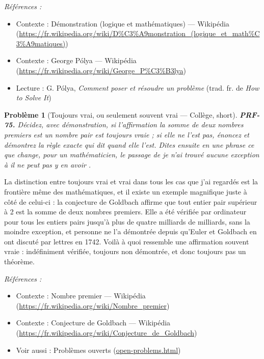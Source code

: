 \documentclass[11pt]{article}
\newtheorem{problem}{Problème}
\newenvironment{refs}{\par\small\noindent\emph{Références :}\begin{itemize}\setlength\itemsep{0pt}}{\end{itemize}\normalsize}
\begin{document}
\begin{refs}
\item Contexte : Démonstration (logique et mathématiques) --- Wikipédia (\url{https://fr.wikipedia.org/wiki/D%C3%A9monstration_(logique_et_math%C3%A9matiques)})
\item Contexte : George Pólya --- Wikipédia (\url{https://fr.wikipedia.org/wiki/George_P%C3%B3lya})
\item Lecture : G. Pólya, \textit{Comment poser et résoudre un problème} (trad. fr. de \textit{How to Solve It})
\end{refs}

\bigskip

\begin{problem}[{Toujours vrai, ou seulement souvent vrai --- Collège, short}]
\textbf{PRF-75.} Décidez, avec démonstration, si l'affirmation \og{} la
somme de deux nombres premiers est un nombre pair \fg{} est toujours vraie ; si elle ne l'est
pas, énoncez et démontrez la règle exacte qui dit quand elle l'est. Dites ensuite en une
phrase ce que change, pour un mathématicien, le passage de \og{} je n'ai trouvé aucune
exception \fg{} à \og{} il ne peut pas y en avoir \fg{}.
\end{problem}

\noindent La distinction entre \og{} toujours vrai \fg{} et \og{} vrai dans tous les cas que
j'ai regardés \fg{} est la frontière même des mathématiques, et il existe un exemple magnifique
juste à côté de celui-ci : la conjecture de Goldbach affirme que tout entier pair supérieur
à 2 est la somme de deux nombres premiers. Elle a été vérifiée par ordinateur pour tous les
entiers pairs jusqu'à plus de quatre milliards de milliards, sans la moindre exception, et
personne ne l'a démontrée depuis qu'Euler et Goldbach en ont discuté par lettres en 1742.
Voilà à quoi ressemble une affirmation \og{} souvent vraie \fg{} : indéfiniment vérifiée, toujours
non démontrée, et donc toujours pas un théorème.

\begin{refs}
\item Contexte : Nombre premier --- Wikipédia (\url{https://fr.wikipedia.org/wiki/Nombre_premier})
\item Contexte : Conjecture de Goldbach --- Wikipédia (\url{https://fr.wikipedia.org/wiki/Conjecture_de_Goldbach})
\item Voir aussi : Problèmes ouverts (\url{open-problems.html})
\end{refs}

\bigskip
\end{document}
